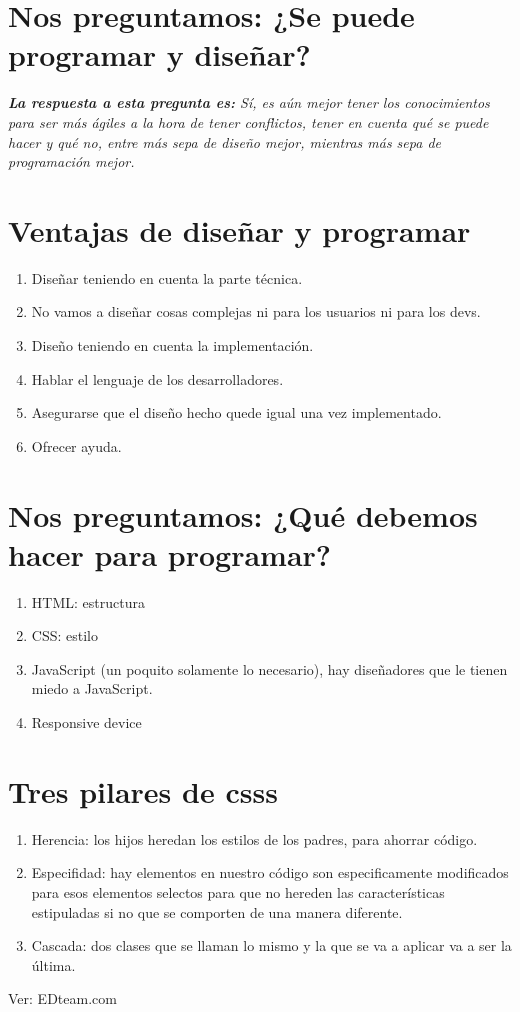 \section{\textbf{Nos preguntamos:} ¿Se puede programar y diseñar?}
\emph{\textbf{La respuesta a esta pregunta es: }Sí, es aún mejor tener los conocimientos para ser más ágiles a la hora de tener conflictos, tener en cuenta qué se puede hacer y qué no, entre más sepa de diseño mejor, mientras más sepa de programación mejor.}
\section{Ventajas de diseñar y programar}
\begin{enumerate}
    \item Diseñar teniendo en cuenta la parte técnica.
    \item No vamos a diseñar cosas complejas ni para los usuarios ni para los devs.
    \item Diseño teniendo en cuenta la implementación.
    \item Hablar el lenguaje de los desarrolladores.
    \item Asegurarse que el diseño hecho quede igual una vez implementado.
    \item Ofrecer ayuda.
\end{enumerate}
\section{\textbf{Nos preguntamos:} ¿Qué debemos hacer para programar?}
\begin{enumerate}
    \item HTML: estructura
    \item CSS: estilo
    \item JavaScript (un poquito solamente lo necesario), hay diseñadores que le tienen miedo a JavaScript.
    \item Responsive device
\end{enumerate}
\section{Tres pilares de csss}
\begin{enumerate}
    \item Herencia: los hijos heredan los estilos de los padres, para ahorrar código.
    \item Especifidad: hay elementos en nuestro código son especificamente modificados para esos elementos selectos para que no hereden las características estipuladas si no que se comporten de una manera diferente.
    \item Cascada: dos clases que se llaman lo mismo y la que se va a aplicar va a ser la última. 
\end{enumerate}
Ver: EDteam.com 
